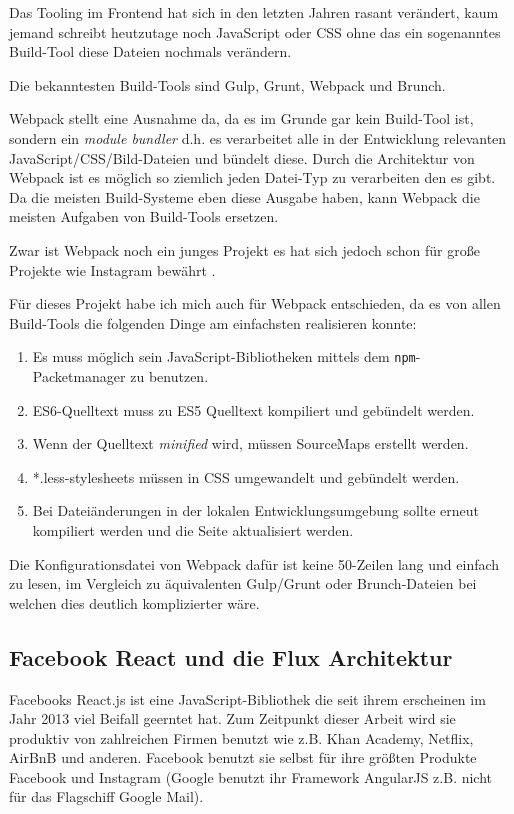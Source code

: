 \documentclass[12pt,twoside]{book}
\begin{document}
Das Tooling im Frontend hat sich in den letzten Jahren rasant verändert, kaum jemand schreibt heutzutage noch JavaScript oder CSS ohne das ein sogenanntes Build-Tool diese Dateien nochmals verändern.

Die bekanntesten Build-Tools sind Gulp\cite{gulp}, Grunt\cite{grunt}, Webpack\cite{webpack} und Brunch\cite{brunch}.

Webpack stellt eine Ausnahme da, da es im Grunde gar kein Build-Tool ist, sondern ein \textit{module bundler} d.h. es verarbeitet alle in der Entwicklung relevanten JavaScript/CSS/Bild-Dateien und bündelt diese. Durch die Architektur von Webpack ist es möglich so ziemlich jeden Datei-Typ zu verarbeiten den es gibt.
Da die meisten Build-Systeme eben diese Ausgabe haben, kann Webpack die meisten Aufgaben von Build-Tools ersetzen.

Zwar ist Webpack noch ein junges Projekt es hat sich jedoch schon für große Projekte wie Instagram bewährt \cite{petehuntwebpack}.

Für dieses Projekt habe ich mich auch für Webpack entschieden, da es von allen Build-Tools die folgenden Dinge am einfachsten realisieren konnte:

\begin{enumerate}
	\item Es muss möglich sein JavaScript-Bibliotheken mittels dem \texttt{npm}-Packetmanager zu benutzen.
	\item ES6-Quelltext muss zu ES5 Quelltext kompiliert und gebündelt werden.
	\item Wenn der Quelltext \textit{minified} wird, müssen SourceMaps erstellt werden.
	\item *.less-stylesheets müssen in CSS umgewandelt und gebündelt werden.
	\item Bei Dateiänderungen in der lokalen Entwicklungsumgebung sollte erneut kompiliert werden und die Seite aktualisiert werden.
\end{enumerate}

Die Konfigurationsdatei von Webpack dafür ist keine 50-Zeilen lang und einfach zu lesen, im Vergleich zu äquivalenten Gulp/Grunt oder Brunch-Dateien bei welchen dies deutlich komplizierter wäre.

\subsection{Facebook React und die Flux Architektur}\label{sec:flux}

Facebooks React.js\cite{react} ist eine JavaScript-Bibliothek die seit ihrem erscheinen im Jahr 2013 viel Beifall geerntet hat. Zum Zeitpunkt dieser Arbeit wird sie produktiv von zahlreichen Firmen benutzt wie z.B. Khan Academy\cite{khan}, Netflix\cite{netflix}, AirBnB\cite{airbnb} und anderen. Facebook benutzt sie selbst für ihre größten Produkte Facebook und Instagram (Google benutzt ihr Framework AngularJS z.B. nicht für das Flagschiff Google Mail).
\end{document}

